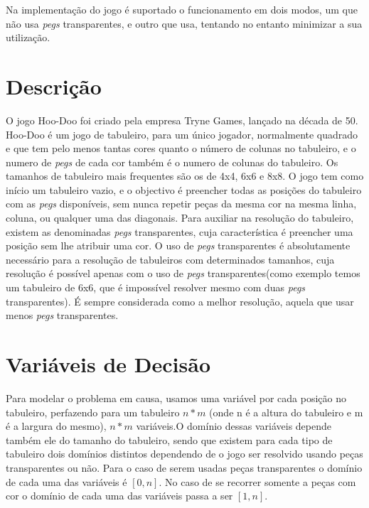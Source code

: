 \documentclass{llncs}
\begin{document}
Na implementa\c{c}\~{a}o do jogo \'{e} suportado o funcionamento em dois modos, um que n\~{a}o usa \emph{pegs} transparentes, e outro que usa, tentando no entanto minimizar a sua utiliza\c{c}\~{a}o.

%

\section{Descri\c{c}\~{a}o}
%
O jogo Hoo-Doo foi criado pela empresa Tryne Games, lan\c{c}ado na d\'{e}cada de 50. Hoo-Doo \'{e} um jogo de tabuleiro, para um \'{u}nico jogador, normalmente quadrado e que tem pelo menos tantas cores quanto o n\'{u}mero de colunas no tabuleiro, e o numero de \emph{\emph{pegs}} de cada cor tamb\'{e}m \'{e} o numero de colunas do tabuleiro. Os tamanhos de tabuleiro mais frequentes s\~{a}o os de 4x4, 6x6 e 8x8. O jogo tem como in\'{i}cio um tabuleiro vazio, e o objectivo \'{e} preencher todas as posi\c{c}\~{o}es do tabuleiro com as \emph{pegs} dispon\'{i}veis, sem nunca repetir pe\c{c}as da mesma cor na mesma linha, coluna, ou qualquer uma das diagonais. Para auxiliar na resolu\c{c}\~{a}o do tabuleiro, existem as denominadas \emph{pegs} transparentes, cuja caracter\'{i}stica \'{e} preencher uma posi\c{c}\~{a}o sem lhe atribuir uma cor. O uso de \emph{pegs} transparentes \'{e} absolutamente necess\'{a}rio para a resolu\c{c}\~{a}o de tabuleiros com determinados tamanhos, cuja resolu\c{c}\~{a}o \'{e} poss\'{i}vel apenas com o uso de \emph{pegs} transparentes(como exemplo temos um tabuleiro de 6x6, que \'{e} imposs\'{i}vel resolver mesmo com duas \emph{pegs} transparentes). \'{E} sempre considerada como a melhor resolu\c{c}\~{a}o, aquela que usar menos \emph{pegs} transparentes.






\section{Vari\'{a}veis de Decis\~{a}o}

Para modelar o problema em causa, usamos uma vari\'{a}vel por cada posi\c{c}\~{a}o no tabuleiro, perfazendo para um tabuleiro $n * m$ (onde n \'{e} a altura do tabuleiro e m \'{e} a largura do mesmo), $n * m$ vari\'{a}veis.O dom\'{i}nio dessas vari\'{a}veis depende tamb\'{e}m ele do tamanho do tabuleiro, sendo que existem para cada tipo de tabuleiro dois dom\'{i}nios distintos dependendo de o jogo ser resolvido usando pe\c{c}as transparentes ou n\~{a}o.
Para o caso de serem usadas pe\c{c}as transparentes o dom\'{i}nio de cada uma das vari\'{a}veis \'{e} $[0,n]$.
No caso de se recorrer somente a pe\c{c}as com cor o dom\'{i}nio de cada uma das vari\'{a}veis passa a ser $[1,n]$.
\end{document}
